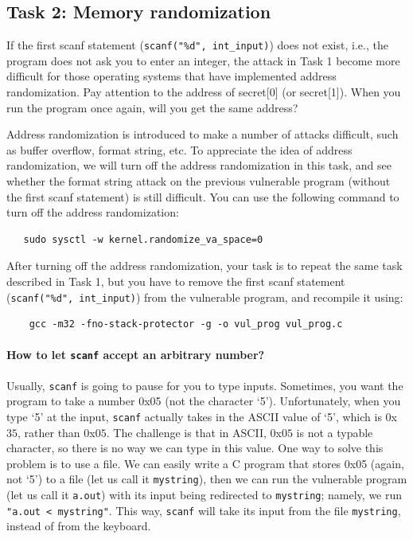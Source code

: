 \subsection{Task 2: Memory randomization}

If the first scanf statement ({\tt scanf("\%d", int\_input)})
does not exist, i.e., the program does not ask you to
enter an integer, the attack in Task 1 become more difficult 
for those operating systems that have implemented address 
randomization. Pay attention to the address of secret[0] (or secret[1]). 
When you run the program once again, will you get the same
address?

Address randomization is introduced to make a number of 
attacks difficult, such as buffer overflow, format string, etc. 
To appreciate the idea of address randomization, we will turn
off the address randomization in this task, and see whether the 
format string attack on the previous vulnerable program (without
the first scanf statement) is still difficult. You can use the following
command to turn off the address randomization:

\begin{verbatim}
   sudo sysctl -w kernel.randomize_va_space=0
\end{verbatim}


After turning off the address randomization, your task is to 
repeat the same task described in Task 1, but you have to 
remove the first scanf statement ({\tt scanf("\%d", int\_input)})
from the vulnerable program, and recompile it using:

\begin{verbatim}
    gcc -m32 -fno-stack-protector -g -o vul_prog vul_prog.c
\end{verbatim}

\paragraph{How to let {\tt scanf} accept an arbitrary number?}
Usually, {\tt scanf} is going to pause for you to type inputs. 
Sometimes, you want the program to take a number 0x05 (not the 
character `5'). Unfortunately, when you type `5' at the input, {\tt scanf}
actually takes in the ASCII value of `5', which is 0x$35$, rather
than 0x$05$. The challenge is that in ASCII, 0x$05$ is not a typable
character, so there is no way we can type in this value. 
One way to solve this problem is to use a file. 
We can easily write a C program that stores 0x05 (again, not `5')  
to a file (let us call it {\tt mystring}), then we can run the vulnerable program (let us 
call it {\tt a.out}) with its input being redirected to {\tt mystring}; 
namely, we run {\tt "a.out < mystring"}. This way, {\tt scanf} will take its 
input from the file {\tt mystring}, instead of from the keyboard.

